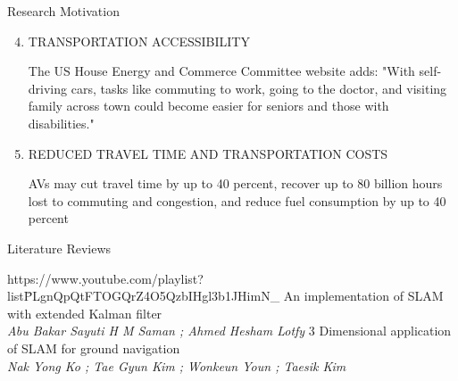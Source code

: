 \documentclass{beamer}
\begin{document}
\begin{frame}[t]{Research Motivation}
\begin{enumerate}
\setcounter{enumi}{3}
\item TRANSPORTATION ACCESSIBILITY\\
\vspace{0.5pt}
\begin{tcolorbox}[colback=green!5!white,colframe=green!75!black]
The US House Energy and Commerce Committee website adds: "With self-driving cars, tasks like commuting to work, going to the doctor, and visiting family across town could become easier for seniors and those with disabilities."
\end{tcolorbox}
\item REDUCED TRAVEL TIME AND TRANSPORTATION COSTS\\
\vspace{0.5pt}
\begin{tcolorbox}[colback=green!5!white,colframe=green!75!black]
AVs may cut travel time by up to 40 percent, recover up to 80 billion hours lost to commuting and congestion, and reduce fuel consumption by up to 40 percent
\end{tcolorbox}
\end{enumerate}
\end{frame}

\begin{frame}{Literature Reviews}
\begin{thebibliography}{9}
https://www.youtube.com/playlist?\\
list\=PLgnQpQtFTOGQrZ4O5QzbIHgl3b1JHimN\_
An implementation of SLAM with extended Kalman filter\\
\textit{Abu Bakar Sayuti H M Saman ; Ahmed Hesham Lotfy}
3 Dimensional application of SLAM for ground navigation\\
\textit{Nak Yong Ko ; Tae Gyun Kim ; Wonkeun Youn ; Taesik Kim}
\end{thebibliography}
\end{frame}
\end{document}
